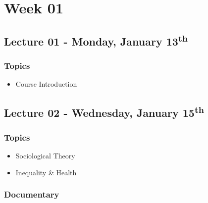 \documentclass[]{book}
\providecommand{\tightlist}{%
  \setlength{\itemsep}{0pt}\setlength{\parskip}{0pt}}
\begin{document}
\newpage

\hypertarget{week-01}{%
\section*{Week 01}\label{week-01}}

\hypertarget{lecture-01---monday-january-13th}{%
\subsection*{\texorpdfstring{Lecture 01 - Monday, January 13\textsuperscript{th}}{Lecture 01 - Monday, January 13th}}\label{lecture-01---monday-january-13th}}

\hypertarget{topics}{%
\subsubsection*{Topics}\label{topics}}

\begin{itemize}
\tightlist
\item
  Course Introduction
\end{itemize}

\hypertarget{lecture-02---wednesday-january-15th}{%
\subsection*{\texorpdfstring{Lecture 02 - Wednesday, January 15\textsuperscript{th}}{Lecture 02 - Wednesday, January 15th}}\label{lecture-02---wednesday-january-15th}}

\hypertarget{topics-1}{%
\subsubsection*{Topics}\label{topics-1}}

\begin{itemize}
\tightlist
\item
  Sociological Theory
\item
  Inequality \& Health
\end{itemize}

\hypertarget{documentary}{%
\subsubsection*{Documentary}\label{documentary}}
\end{document}
